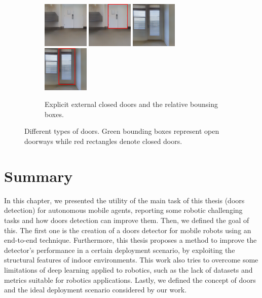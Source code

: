\begin{figure}[h!]
	\begin{subfigure}[b]{\linewidth}
		\centering
		\includegraphics[width=0.24\textwidth]{images/explicitexternalclosed1.png}
		\hfill
		\includegraphics[width=0.24\textwidth]{images/explicitexternalclosed1boxed.png}
		\hfill
		\includegraphics[width=0.24\textwidth]{images/explicitexternalclosed2.png}
		\hfill
		\includegraphics[width=0.24\textwidth]{images/explicitexternalclosed2boxed.png}
		\caption{Explicit external closed doors and the relative bounsing boxes.}
	\end{subfigure}
	\caption{Different types of doors. Green bounding boxes represent open doorways while red rectangles denote closed doors.}
\end{figure}

\section{Summary}

In this chapter, we presented the utility of the main task of this thesis (doors detection) for autonomous mobile agents, reporting some robotic challenging tasks and how doors detection can improve them. Then, we defined the goal of this. The first one is the creation of a doors detector for mobile robots using an end-to-end technique. Furthermore, this thesis proposes a method to improve the detector's performance in a certain deployment scenario, by exploiting the structural features of indoor environments. This work also tries to overcome some limitations of deep learning applied to robotics, such as the lack of datasets and metrics suitable for robotics applications. Lastly, we defined the concept of doors and the ideal deployment scenario considered by our work.

